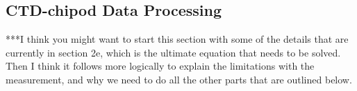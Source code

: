 \documentclass{ametsoc}
\begin{document}
%
%
%
%
%


\subsection{CTD-chipod Data Processing}

***I think you might want to start this section with some of the details that are currently in section 2e, which is the ultimate equation that needs to be solved.  Then I think it follows more logically to explain the limitations with the measurement, and why we need to do all the other parts that are outlined below.
\end{document}
